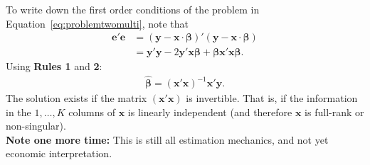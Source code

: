 \noindent To write down the first order conditions of the problem in Equation~\eqref{eq:problemtwomulti}, note that
\begin{align}
	\bm{e}' \bm{e} &= \left( \bm{y} - \bm{x} \cdot \bm{\beta} \right)' \left( \bm{y} - \bm{x} \cdot \bm{\beta} \right) \nonumber \\
	               &= \bm{y}' \bm{y} - 2 \bm{y}'\bm{x}\bm{\beta} + \bm{\beta} \bm{x}'\bm{x} \bm{\beta}. 
\end{align}
\noindent Using \textbf{Rules 1} and \textbf{2}: 
\begin{align}
	\hat{\bm{\beta}} = {\left( \bm{x}'\bm{x} \right)}^{-1} \bm{x}' \bm{y}. 
\end{align}
\noindent The solution exists if the matrix $\left( \bm{x}'\bm{x} \right)$ is invertible. That is, if the information in the $1, \ldots, K$ columns of $\bm{x}$ is linearly independent (and therefore $\bm{x}$ is full-rank or non-singular).\\ 

\noindent \textbf{Note one more time:} This is still all estimation mechanics, and not yet economic interpretation. 

